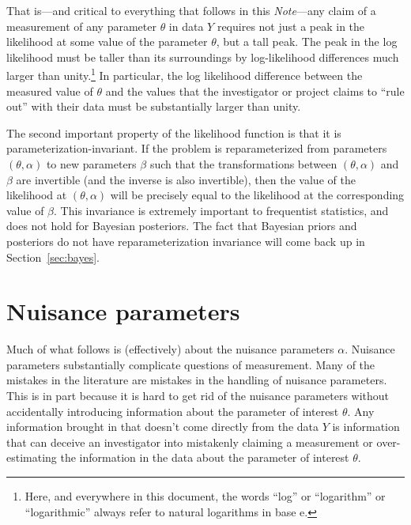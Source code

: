 \documentclass{article}
\newcommand{\documentname}{\textsl{Note}}
\newcommand{\sectionname}{Section}
\newcommand{\secref}[1]{\sectionname~\ref{#1}}
\newcommand{\e}{\mathrm{e}} %
\begin{document}
That is---and critical to everything that follows in this \documentname---any claim of a measurement of any parameter $\theta$ in data $Y$ requires not just a peak in the likelihood at some value of the parameter $\theta$, but a tall peak.
The peak in the log likelihood must be taller than its surroundings by log-likelihood differences much larger than unity.\footnote{Here, and everywhere in this document, the words ``log'' or ``logarithm'' or ``logarithmic'' always refer to natural logarithms in base $\e$.}
In particular, the log likelihood difference between the measured value of $\theta$ and the values that the investigator or project claims to ``rule out'' with their data must be substantially larger than unity.

The second important property of the likelihood function is that it is parameterization-invariant.
If the problem is reparameterized from parameters $(\theta,\alpha)$ to new parameters $\beta$ such that the transformations between $(\theta,\alpha)$ and $\beta$ are invertible (and the inverse is also invertible), then the value of the likelihood at $(\theta,\alpha)$ will be precisely equal to the likelihood at the corresponding value of $\beta$.
This invariance is extremely important to frequentist statistics, and does not hold for Bayesian posteriors.
The fact that Bayesian priors and posteriors do not have reparameterization invariance will come back up in \secref{sec:bayes}.

\section{Nuisance parameters}

Much of what follows is (effectively) about the nuisance parameters $\alpha$.
Nuisance parameters substantially complicate questions of measurement.
Many of the mistakes in the literature are mistakes in the handling of nuisance parameters.
This is in part because it is hard to get rid of the nuisance parameters without accidentally introducing information about the parameter of interest $\theta$.
Any information brought in that doesn't come directly from the data $Y$ is information that can deceive an investigator into mistakenly claiming a measurement or over-estimating the information in the data about the parameter of interest $\theta$.
\end{document}
